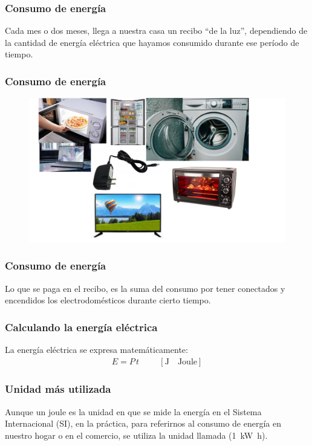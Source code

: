 \documentclass[14pt]{beamer}
\begin{document}
\begin{frame}
\frametitle{Consumo de energía}
Cada mes o dos meses, llega a nuestra casa un recibo \enquote{de la luz}, \pause dependiendo de la cantidad de energía eléctrica que hayamos consumido durante ese período de tiempo.
\end{frame}
\begin{frame}
\frametitle{Consumo de energía}
\begin{figure}
    \centering
    \includegraphics[scale=0.7]{Imagenes/Energia_Electrica_08.jpg}
\end{figure}
\end{frame}
\begin{frame}
\frametitle{Consumo de energía}
Lo que se paga en el recibo, es la suma del consumo por tener conectados y encendidos los electrodomésticos durante cierto tiempo.
\end{frame}
\begin{frame}
\frametitle{Calculando la energía eléctrica}
La energía eléctrica se expresa matemáticamente:
\pause
\begin{align*}
E = P \, t \hspace{1cm} \left[ \unit{\joule} \quad \text{Joule} \right]
\end{align*}
\end{frame}
\begin{frame}
\frametitle{Unidad más utilizada}
Aunque un joule es la unidad en que se mide la energía en el Sistema Internacional (SI), \pause en la práctica, para referirnos al consumo de energía en nuestro hogar o en el comercio, se utiliza la unidad llamada  (\SI{1}{\kilo\watt\hour}).
\end{frame}
\end{document}
